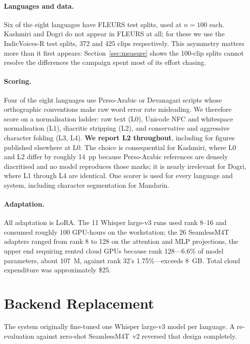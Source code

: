 \documentclass[sigconf,anonymous,review]{acmart}
\begin{document}
\paragraph{Languages and data.} Six of the eight languages have FLEURS test
splits, used at $n=100$ each. Kashmiri and Dogri do not appear in FLEURS at all; for
these we use the IndicVoices-R test splits, 372 and 425 clips respectively. This
asymmetry matters more than it first appears: Section~\ref{sec:measure} shows
the 100-clip splits cannot resolve the differences the campaign spent most of
its effort chasing.

\paragraph{Scoring.} Four of the eight languages use Perso-Arabic or Devanagari
scripts whose orthographic conventions make raw word error rate misleading. We
therefore score on a normalisation ladder: raw text (L0), Unicode NFC and
whitespace normalisation (L1), diacritic stripping (L2), and conservative and
aggressive character folding (L3, L4). \textbf{We report L2 throughout},
including for figures published elsewhere at L0. The choice is consequential for
Kashmiri, where L0 and L2 differ by roughly 14~pp because Perso-Arabic
references are densely diacritised and no model reproduces those marks; it is
nearly irrelevant for Dogri, where L1 through L4 are identical. One scorer is
used for every language and system, including character segmentation for
Mandarin.

\paragraph{Adaptation.} All adaptation is LoRA. The 11 Whisper large-v3 runs
used rank 8--16 and consumed roughly 100 GPU-hours on the workstation; the 26
SeamlessM4T adapters ranged from rank 8 to 128 on the attention and MLP
projections, the upper end requiring rented cloud GPUs because rank 128---6.6\%
of model parameters, about 107~M, against rank 32's 1.75\%---exceeds 8~GB. Total
cloud expenditure was approximately \$25.

\section{Backend Replacement}
\label{sec:backend}

The system originally fine-tuned one Whisper large-v3 model per language. A
re-evaluation against zero-shot SeamlessM4T~v2 reversed that design completely.
\end{document}
